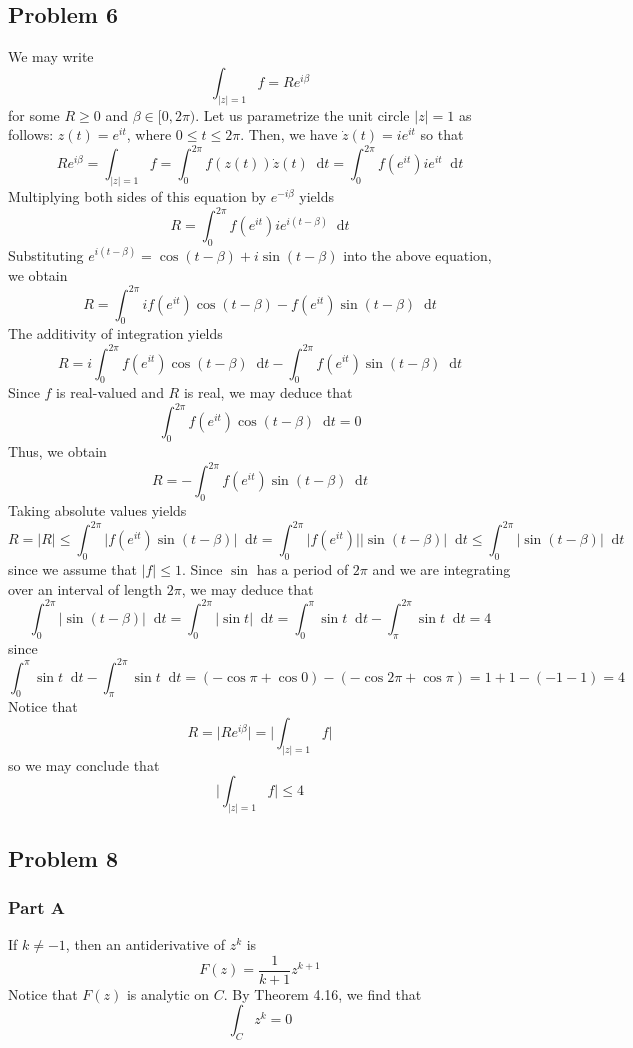 \documentclass[12pt]{article}
\newcommand*\diff{\mathop{}\!\mathrm{d}}
\begin{document}
\subsection*{Problem 6}
We may write 
\[
\int_{\vert z \vert = 1} f  = Re^{i\beta}
\] for some $R \geq 0$ and $\beta \in [0,2\pi)$. Let us parametrize the unit circle $\vert z \vert = 1$ as follows: $z(t) = e^{it}$, where $0 \leq t \leq 2\pi$. Then, we have $\dot{z}(t) = ie^{it}$ so that
\[
Re^{i\beta} = \int_{\vert z \vert = 1} f = \int_{0}^{2\pi} f(z(t)) \dot{z}(t) \diff t =  \int_{0}^{2\pi} f(e^{it})ie^{it} \diff t
\] Multiplying both sides of this equation by $e^{-i\beta}$ yields
\[
R =  \int_{0}^{2\pi} f(e^{it})ie^{i(t-\beta)} \diff t
\] Substituting $e^{i(t-\beta)} = \cos(t-\beta) + i \sin(t-\beta)$ into the above equation, we obtain
\[
R = \int_0^{2\pi} if(e^{it})\cos(t-\beta) - f(e^{it}) \sin(t-\beta) \diff t
\] The additivity of integration yields
\[
R = i \int_0^{2\pi} f(e^{it})\cos(t-\beta) \diff t - \int_0^{2\pi} f(e^{it}) \sin(t-\beta) \diff t
\] Since $f$ is real-valued and $R$ is real, we may deduce that
\[
\int_0^{2\pi} f(e^{it})\cos(t-\beta) \diff t = 0
\] Thus, we obtain
\[
R = - \int_0^{2\pi} f(e^{it}) \sin(t-\beta) \diff t
\] Taking absolute values yields
\[
R = \vert R \vert \leq \int_{0}^{2\pi} \vert f(e^{it}) \sin(t-\beta) \vert \diff t = \int_{0}^{2\pi} \vert f(e^{it}) \vert \vert \sin(t-\beta) \vert \diff t \leq \int_{0}^{2\pi} \vert \sin(t-\beta) \vert \diff t
\] since we assume that $\vert f \vert \leq 1$. Since $\sin$ has a period of $2\pi$ and we are integrating over an interval of length $2\pi$, we may deduce that
\[
\int_{0}^{2\pi} \vert \sin(t-\beta) \vert \diff t =\int_{0}^{2\pi} \vert \sin t \vert \diff t = \int_0^{\pi} \sin t \diff t - \int_{\pi}^{2\pi} \sin t \diff t = 4
\] since
\[
\int_0^{\pi} \sin t \diff t - \int_{\pi}^{2\pi} \sin t \diff t = (-\cos \pi + \cos 0) - (-\cos 2\pi + \cos \pi) = 1+1-(-1-1) = 4
\] Notice that
\[
R = \vert R e^{i\beta} \vert = \bigg \vert \int_{\vert z \vert = 1} f  \bigg\vert 
\] so we may conclude that
\[
\bigg \vert \int_{\vert z \vert = 1} f  \bigg\vert \leq 4
\]
\newpage
\subsection*{Problem 8}
\subsubsection*{Part A}
If $k \neq -1$, then an antiderivative of $z^k$ is
\[
 F(z) = \frac{1}{k+1}z^{k+1}
\] Notice that $F(z)$ is analytic on $C$. By Theorem 4.16, we find that
\[
\int_C z^k = 0
\]
\end{document}
